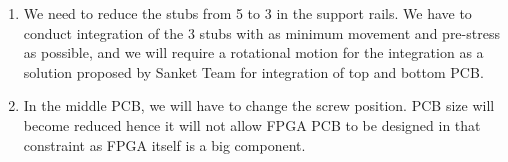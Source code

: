 \documentclass[../../main.tex]{subfiles}
\begin{document}
\begin{enumerate}
    \begin{enumerate}
        \item We need to reduce the stubs from 5 to 3 in the support rails. We have to conduct integration of the 3 stubs with as minimum movement and pre-stress as possible, and we will require a rotational motion for the integration as a solution proposed by Sanket Team for integration of top and bottom PCB.
        \item In the middle PCB, we will have to change the screw position. PCB size will become reduced hence it will not allow FPGA PCB to be designed in that constraint as FPGA itself is a big component.
    \end{enumerate}
\end{enumerate}
\end{document}
